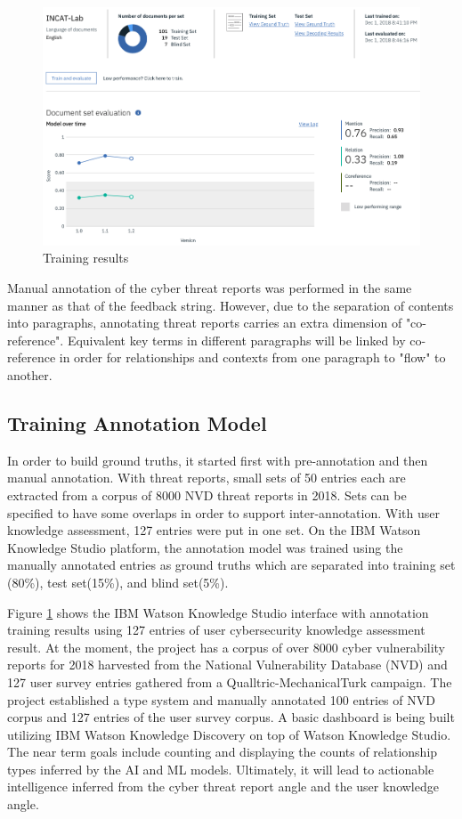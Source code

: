 \documentclass[conference]{IEEEtran}
\begin{document}
\begin{figure}[ht]
  \centering
  \includegraphics[width=14cm]{./images/trainingResults}
  \caption{Training results}
  \label{Figure:trainingResults}
\end{figure}

Manual annotation of the cyber threat reports was performed in the same manner as that of the feedback string. However, due to the separation of contents into paragraphs, annotating threat reports carries an extra dimension of "co-reference". Equivalent key terms in different paragraphs will be linked by co-reference in order for relationships and contexts from one paragraph to "flow"  to another.

\subsection{Training Annotation Model}
In order to build ground truths, it started first with pre-annotation and then manual annotation. With threat reports, small sets of 50 entries each are extracted from a corpus of 8000 NVD threat reports in 2018. Sets can be specified to have some overlaps in order to support inter-annotation. With user knowledge assessment, 127 entries were put in one set. On the IBM Watson Knowledge Studio platform, the annotation model was trained using the manually annotated entries as ground truths which are separated into training set (80\%), test set(15\%), and blind set(5\%).

Figure \ref{Figure:trainingResults} shows the IBM Watson Knowledge Studio interface with annotation training results using 127 entries of user cybersecurity knowledge assessment result. At the moment, the project has a corpus of over 8000 cyber vulnerability reports for 2018 harvested from the National Vulnerability Database (NVD) and 127 user survey entries gathered from a Qualltric-MechanicalTurk campaign. The project established a type system and manually annotated 100 entries of NVD corpus and 127 entries of the user survey corpus. A basic dashboard is being built utilizing IBM Watson Knowledge Discovery on top of Watson Knowledge Studio. The near term goals include counting and displaying the counts of relationship types inferred by the AI and ML models. Ultimately, it will lead to actionable intelligence inferred from the cyber threat report angle and the user knowledge angle.
\end{document}
